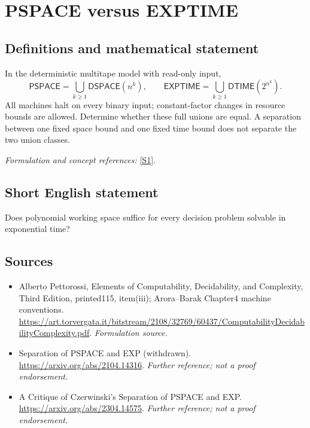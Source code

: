 \documentclass[11pt]{article}
\begin{document}
\section*{\texorpdfstring{PSPACE versus EXPTIME}{PSPACE versus EXPTIME}}\label{90}
\subsection{Definitions and mathematical statement}
In the deterministic multitape model with read-only input,
\[
 \mathsf{PSPACE}=\bigcup_{k\ge1}\mathsf{DSPACE}(n^k),\qquad
 \mathsf{EXPTIME}=\bigcup_{k\ge1}\mathsf{DTIME}(2^{n^k}).
\]
All machines halt on every binary input; constant-factor changes in resource bounds are allowed. Determine whether these full unions are equal. A separation between one fixed space bound and one fixed time bound does not separate the two union classes.
\par\smallskip\textit{Formulation and concept references:} \href{https://art.torvergata.it/bitstream/2108/32769/60437/ComputabilityDecidabilityComplexity.pdf}{[S1]}.

\subsection{Short English statement}
Does polynomial working space suffice for every decision problem solvable in exponential time?
\subsection{Sources}
\begin{itemize}
\item[S1]Alberto Pettorossi, Elements of Computability, Decidability, and Complexity, Third Edition, printed115, item(iii); Arora–Barak Chapter4 machine conventions.
\url{https://art.torvergata.it/bitstream/2108/32769/60437/ComputabilityDecidabilityComplexity.pdf}.
\textit{Formulation source.}
\item[S2]Separation of PSPACE and EXP (withdrawn).
\url{https://arxiv.org/abs/2104.14316}.
\textit{Further reference; not a proof endorsement.}
\item[S3]A Critique of Czerwinski's Separation of PSPACE and EXP.
\url{https://arxiv.org/abs/2304.14575}.
\textit{Further reference; not a proof endorsement.}
\end{itemize}
\end{document}
